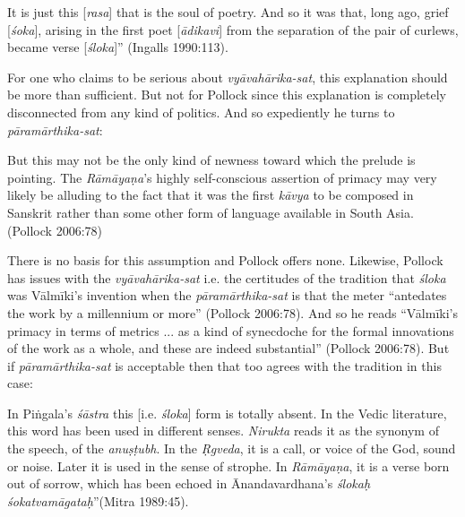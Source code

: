 \begin{myquote}
It is just this [\textsl{rasa}] that is the soul of poetry. And so it was that, long ago, grief [\textsl{śoka}], arising in the first poet [\textsl{ādikavi}] from the separation of the pair of curlews, became verse [\textsl{śloka}]'' (Ingalls 1990:113). 
\end{myquote}

For one who claims to be serious about \textsl{vyāvahārika-sat}, this explanation should be more than sufficient. But not for Pollock since this explanation is completely disconnected from any kind of politics. And so expediently he turns to \textsl{pāramārthika-sat}:  
\vskip 1pt

\begin{myquote}
But this may not be the only kind of newness toward which the prelude is pointing. The \textsl{Rāmāyaṇa}'s highly self-conscious assertion of primacy may very likely be alluding to the fact that it was the first \textsl{kāvya} to be composed in Sanskrit rather than some other form of language available in South Asia. 
\hfill (Pollock 2006:78)
\end{myquote}
\vskip 1pt

There is no basis for this assumption and Pollock offers none. Likewise, Pollock has issues with the \textsl{vyāvahārika-sat} i.e. the certitudes of the tradition that \textsl{śloka} was Vālmīki's invention when the \textsl{pāramārthika-sat} is that the meter ``antedates the work by a millennium or more'' (Pollock 2006:78). And so he reads ``Vālmīki’s primacy in terms of metrics ... as a kind of synecdoche for the formal innovations of the work as a whole, and these are indeed substantial” (Pollock 2006:78). But if \textsl{pāramārthika-sat} is acceptable then that too agrees with the tradition in this case:
\vskip 1pt

\begin{myquote}
In Piṅgala's \textsl{śāstra} this [i.e. \textsl{śloka}] form is totally absent. In the Vedic literature, this word has been used in different senses. \textsl{Nirukta} reads it as the synonym of the speech, of the \textsl{anuṣṭubh}. In the \textsl{Ṛgveda}, it is a call, or voice of the God, sound or noise. Later it is used in the sense of strophe. In \textsl{Rāmāyaṇa}, it is a verse born out of sorrow, which has been echoed in Ānandavardhana's \textsl{ślokaḥ śokatvamāgataḥ}''\hfill (Mitra 1989:45).
\end{myquote}
\vskip 1pt

